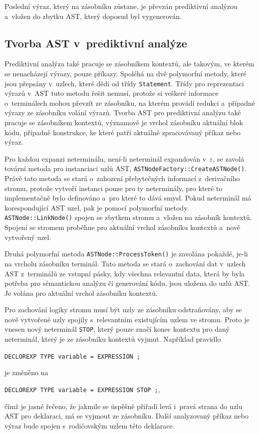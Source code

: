 Poslední výraz, který na zásobníku zůstane, je převzán prediktivní analýzou a~vložen do zbytku AST, který doposud byl vygenerován.

\subsection*{Tvorba AST v~prediktivní analýze}
Prediktivní analýza také pracuje se zásobníkem kontextů, ale takovým, ve kterém se nenacházejí výrazy, pouze příkazy.
Spoléhá na dvě polymorfní metody, které jsou přepsány v~uzlech, které dědí od třídy \texttt{Statement}.
Třídy pro reprezentaci výrazů v~AST tuto metodu řešit nemusí, protože si veškeré informace o~terminálech mohou převzít ze zásobníku, na kterém provádí redukci a~případné výrazy ze zásobníku volání výrazů.
Tvorba AST pro prediktivní analýzu také pracuje se zásobníkem kontextů, významově je vrchol zásobníku aktuální blok kódu, případně konstrukce, ke které patří aktuálně zpracovávaný příkaz nebo výraz.

Pro každou expanzi neterminálu, není-li neterminál expandován v~$\varepsilon$, se zavolá tovární metoda pro instanciaci uzlů AST, \texttt{ASTNodeFactory::CreateASTNode()}.
Právě tato metoda se stará o~zahození přebytečných informací z~derivačního stromu, protože vytvoří instanci pouze pro ty neterminály, pro které to implementačně bylo definováno a~pro které to dává smysl.
Pokud neterminál má korespondující AST uzel, pak je pomocí polymorfní metody \texttt{ASTNode::LinkNode()} spojen se zbytkem stromu a~vložen na zásobník kontextů.
Spojení se stromem proběhne pro aktuální vrchol zásobníku kontextů a~nově vytvořený uzel.

Druhá polymorfní metoda \texttt{ASTNode::ProcessToken()} je zavolána pokaždé, je-li na vrcholu zásobníku terminál.
Tato metoda se stará o~zachování dat v~uzlech AST z~terminálů ze vstupní pásky, kdy všechna relevantní data, která by byla potřeba pro sémantickou analýzu či generování kódu, jsou uložena do uzlů AST.
Je volána pro aktuální vrchol zásobníku kontextů.

Pro zachování logiky stromu musí být uzly ze zásobníku odstraňovány, aby se nově vytvořené uzly spojily s~relevantním existujícím uzlem ve stromu.
Proto je vnesen nový neterminál \texttt{STOP}, který pouze značí konec kontextu pro daný neterminál, který je ze zásobníku kontextů vyjmut.
Například pravidlo
\begin{center}
    \texttt{DECLOREXP \textrightarrow{} TYPE variable = EXPRESSION ;}
\end{center}
je změněno na 
\begin{center}
    \texttt{DECLOREXP \textrightarrow{} TYPE variable = EXPRESSION STOP ;},
\end{center}
čímž je jasně řečeno, že jakmile se úspěšně přiřadí levá i~pravá strana do uzlu AST pro deklaraci, má se vyjmout ze zásobníku.
Další analyzovaný příkaz nebo výraz bude spojen s~rodičovským uzlem této deklarace.

